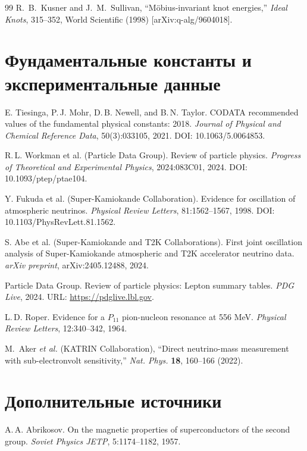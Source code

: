 \documentclass[11pt,a4paper]{article}
\begin{document}
\begin{thebibliography}{99}
	 R.~B.~Kusner and J.~M.~Sullivan, ``Möbius-invariant knot energies,''
	\textit{Ideal Knots}, 315--352, World Scientific (1998) [arXiv:q-alg/9604018].
	
	\section*{Фундаментальные константы и экспериментальные данные}
	
	E. Tiesinga, P.\,J. Mohr, D.\,B. Newell, and B.\,N. Taylor.
	\newblock CODATA recommended values of the fundamental physical constants: 2018.
	\newblock \textit{Journal of Physical and Chemical Reference Data}, 50(3):033105, 2021.
	\newblock DOI: 10.1063/5.0064853.
	
	R.\,L. Workman et al. (Particle Data Group).
	\newblock Review of particle physics.
	\newblock \textit{Progress of Theoretical and Experimental Physics}, 2024:083C01, 2024.
	\newblock DOI: 10.1093/ptep/ptae104.
	
	Y. Fukuda et al. (Super-Kamiokande Collaboration).
	\newblock Evidence for oscillation of atmospheric neutrinos.
	\newblock \textit{Physical Review Letters}, 81:1562--1567, 1998.
	\newblock DOI: 10.1103/PhysRevLett.81.1562.
	
	S. Abe et al. (Super-Kamiokande and T2K Collaborations).
	\newblock First joint oscillation analysis of Super-Kamiokande atmospheric and T2K accelerator neutrino data.
	\newblock \textit{arXiv preprint}, arXiv:2405.12488, 2024.
	
	Particle Data Group.
	 Review of particle physics: Lepton summary tables.
	\newblock \textit{PDG Live}, 2024.
	\newblock URL: \url{https://pdglive.lbl.gov}.
	
	L.\,D. Roper.
	\newblock Evidence for a $P_{11}$ pion-nucleon resonance at 556 MeV.
	\newblock \textit{Physical Review Letters}, 12:340--342, 1964.
	
	M.~Aker \textit{et al.} (KATRIN Collaboration), ``Direct neutrino-mass measurement with sub-electronvolt sensitivity,'' \textit{Nat. Phys.} \textbf{18}, 160--166 (2022).
	
	\section*{Дополнительные источники}
	
	A.\,A. Abrikosov.
	\newblock On the magnetic properties of superconductors of the second group.
	\newblock \textit{Soviet Physics JETP}, 5:1174--1182, 1957.
	

\end{thebibliography}
\end{document}
